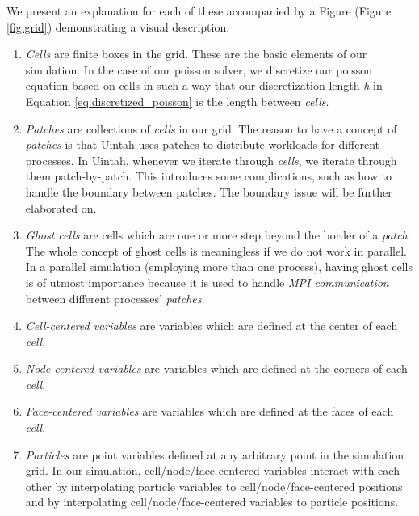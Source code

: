 \documentclass[notitlepage, 12pt]{article}
\begin{document}
We present an explanation for each of these accompanied by a Figure (Figure \ref{fig:grid}) demonstrating a visual description.

\begin{enumerate}
\item \emph{Cells} are finite boxes in the grid. These are the basic elements of our simulation. In the case of our poisson solver, we discretize our poisson equation 
based on cells in such a way that our discretization length \emph{h} in Equation \ref{eq:discretized_poisson} is the length between \emph{cells}.
\item \emph{Patches} are collections of \emph{cells} in our grid. The reason to have a concept of \emph{patches} is that Uintah uses patches to distribute 
workloads for different processes. In Uintah, whenever we iterate through \emph{cells}, we iterate through them patch-by-patch. This introduces some complications, 
such as how to handle the boundary between patches. The boundary issue will be further elaborated on.
\item \emph{Ghost cells} are cells which are one or more step beyond the border of a \emph{patch}. The whole concept of ghost cells is meaningless if we 
do not work in parallel. In a parallel simulation (employing more than one process), having ghost cells is of utmost importance because it is used to handle 
\emph{MPI communication} between different processes' \emph{patches}.
\item \emph{Cell-centered variables} are variables which are defined at the center of each \emph{cell}.
\item \emph{Node-centered variables} are variables which are defined at the corners of each \emph{cell}.
\item \emph{Face-centered variables} are variables which are defined at the faces of each \emph{cell}.
\item \emph{Particles} are point variables defined at any arbitrary point in the simulation grid. In our simulation, cell/node/face-centered variables 
interact with each other by interpolating particle variables to cell/node/face-centered positions and by interpolating cell/node/face-centered variables to 
particle positions.
\end{enumerate}
\end{document}
